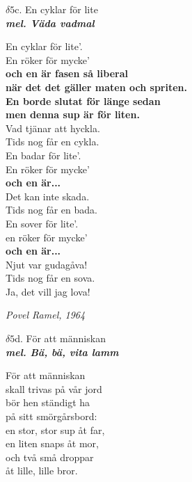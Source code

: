\documentclass[a6paper,10pt]{article}
\newcommand{\mel}[1]{\small\textbf{\textit{mel. #1 \\}}}
\begin{document}
\newpage
\setlength{\oddsidemargin}{-0.37in}
\noindent
\begin{center}
\Large $\delta5$c. En cyklar för lite\\ 
\mel{Väda vadmal}
\end{center}
\vspace{-5pt}
En cyklar för lite'. \\
En röker för mycke' \\
\textbf{och en är fasen så liberal  \\
när det det gäller maten och spriten. \\
En borde slutat för länge sedan\\
men denna sup är för liten.} \\
Vad tjänar att hyckla. \\
Tids nog får en cykla.
\vspace{5pt}\\
En badar för lite'. \\
En röker för mycke' \\
\textbf{och en är...}\\
Det kan inte skada. \\
Tids nog får en bada.
\vspace{5pt}\\
 En sover för lite'. \\
en röker för mycke' \\
\textbf{och en är...}\\
Njut var gudagåva! \\
Tids nog får en sova.\\
Ja, det vill jag lova! 
\begin{flushright}
\textit{Povel Ramel, 1964}
\end{flushright}
\vspace{-10pt}
\begin{center}
\Large $\delta5$d. För att människan\\ 
\mel{Bä, bä, vita lamm}
\end{center}
\vspace{-5pt}
För att människan \\
skall trivas på vår jord \\
bör hen ständigt ha \\
på sitt smörgårsbord: 
\vspace{5pt}\\
en stor, stor sup åt far, \\
en liten snaps åt mor, \\
och två små droppar \\
åt lille, lille bror. 
\end{document}
